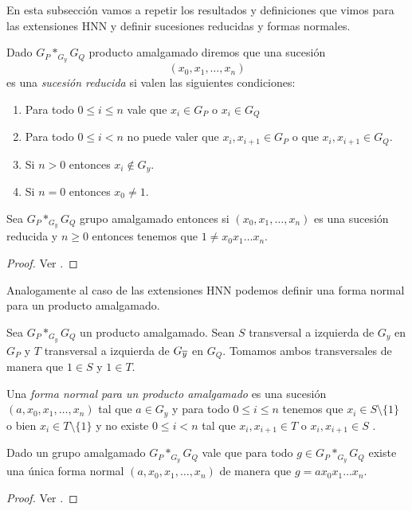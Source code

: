 \documentclass[tesis.tex]{subfiles}
\begin{document}
En esta subsección vamos a repetir los resultados y definiciones que vimos para las extensiones HNN y definir sucesiones reducidas y formas normales.

\begin{deff}\label{deff_amalgamado_fn}
	Dado $G_P \ast_{G_y} G_Q$ producto amalgamado diremos que una sucesión
	\[
	(x_0,x_1,\dots, x_n)
	\]
	es una \emph{sucesión reducida} si valen las siguientes condiciones:
	\begin{enumerate}
		\item Para todo $0 \le i \le n$ vale que $x_{i} \in G_{P}$ o $x_i \in G_Q$
		\item Para todo $0 \le i < n$ no puede valer que $x_i,x_{i+1} \in G_P$ o que $x_i,x_{i+1} \in G_Q$.
		\item Si $n > 0$ entonces $x_i \notin G_y$.
		\item Si $n = 0$ entonces $x_0 \neq 1$.
	\end{enumerate}
\end{deff}


\begin{teo}\label{coro_amalgamado_neq_1}
	Sea $G_P \ast_{G_y} G_Q$ grupo amalgamado entonces si $(x_0,x_1,\dots,x_n)$ es una sucesión reducida y $n \ge 0$ entonces tenemos que $1 \neq x_0x_1\dots x_n$.
\end{teo}
\begin{proof}
	Ver \cite[pp.187-188]{lyndon1977combinatorial}.
\end{proof}

Analogamente al caso de las extensiones HNN podemos definir una forma normal para un producto amalgamado.

\begin{deff}
	Sea $G_P \ast_{G_y} G_Q$ un producto amalgamado.
	Sean $S$ transversal a izquierda de $G_{y}$ en $G_P$ y $T$ transversal a izquierda de $G_{\overline y}$ en $G_{Q}$.
	Tomamos ambos transversales de manera que $1 \in S$ y $1 \in T$.
	
	Una \emph{forma normal para un producto amalgamado} es una sucesión
	$(a,x_0,x_1,\dots, x_n)$ tal que $a \in G_{y}$ y para todo $0\le  i \le n$ tenemos que $x_{i} \in S \setminus \{ 1 \}$ o bien $x_{i} \in T \setminus \{ 1 \}$ y no 
	existe $ 0 \le i  < n$ tal que  $x_{i}, x_{i+1} \in T$ o $x_{i}, x_{i+1} \in S$ .	
\end{deff}

\begin{prop}\label{prop_amalgamado_formanormal}
	Dado un grupo amalgamado $G_P \ast_{G_y} G_Q$
	vale que para todo $g \in G_P \ast_{G_y} G_Q$ 
	existe una única forma normal $(a,x_0,x_1,\dots,x_n)$ de manera que $g= ax_0x_1\dots x_n$.
\end{prop}
\begin{proof}
	Ver \cite[p.187]{lyndon1977combinatorial}.
\end{proof}
\end{document}
